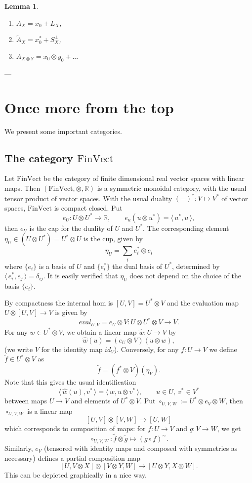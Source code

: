 \documentclass[12pt]{article}
\newtheorem{lemma}{Lemma}
\theoremstyle{definition}
\theoremstyle{remark}
\def\<{\langle\,}
\def\>{\,\rangle}
\def \FV{\mathrm{FinVect}}
\def\bX{ X}
\def\bY{ Y}
\begin{document}
\begin{lemma}\label{lemma:alls}
\begin{enumerate}
\item $A_\bX=x_0+L_\bX$,
\item $\tilde A_\bX=x_0^*+S_\bX^\perp$,
\item $A_{\bX\otimes \bY}=x_0\otimes y_0+...$

\end{enumerate}


\end{lemma}

---
\section{Once more from the top}

We present some important categories.

\subsection{The category $\FV$}

Let  $\FV$ be the category of finite dimensional real vector spaces with linear maps. Then
$(\FV,\otimes, \mathbb R)$ is a symmetric monoidal category, with the usual tensor product
of vector spaces. With the usual duality $(-)^*: V\mapsto V^*$  of vector spaces, $\FV$ is
compact closed.  Put
\[
e_U: U\otimes U^*\to \mathbb R,\qquad e_u(u\otimes u^*)=\<u^*,u\>,
\]
then $e_U$ is the cap for the duality of $U$ and $U^*$. The corresponding element
$\eta_U\in (U\otimes U^*)=U^*\otimes U$ is the cup, given by
\[
\eta_U=\sum_i e_i^*\otimes e_i
\]
where $\{e_i\}$ is a basis of $U$ and $\{e_i^*\}$ the dual basis of $U^*$, determined by
$\<e_i^*,e_j\>=\delta_{ij}$. It is easily verified that $\eta_U$ does not depend on the
choice of the basis $\{e_i\}$.

By compactness the internal hom is  $[U,V]=U^*\otimes V$ and the evaluation map $U\otimes
[U,V]\to V$ is given by
\[
eval_{U,V}=e_U\otimes V: U\otimes U^*\otimes V\to V.
\]
For any  $w\in U^*\otimes V$, we obtain a linear map $\hat w: U\to V$ by
\[
\hat w(u)=(e_U\otimes V)(u\otimes w),
\]
(we write $V$ for the identity map  $id_V$). Conversely, for any $f:U\to V$ we define 
$\tilde f\in U^*\otimes V$ as 
\[
\tilde f=(f^*\otimes V)(\eta_V).
\]
Note that this gives the usual identification 
\[
\<\hat w(u),v^*\>=\<w,u\otimes v^*\>,\qquad u\in U,\
v^*\in V^*
\]
between maps $U\to V$ and elements of $U^*\otimes V$.  Put $\circ_{U,V,W}:=U^*\otimes e_V\otimes
W$, then $\circ_{U,V,W}$ is  a linear map
\[
[U,V]\otimes [V,W]\to [U,W]
\]
which corresponds to composition of maps: for $f:U\to V$ and $g:V\to W$, we get
\[
\circ_{U,V,W}: \tilde f\otimes \tilde g\mapsto (g\circ f)^\sim.
\]
Similarly, $e_V$ (tensored with identity maps and composed with  symmetries as necessary) defines a partial
composition map
\[
[U,V\otimes X]\otimes [V\otimes Y,W]\to [U\otimes Y, X\otimes W].
\]
This can be depicted graphically in a nice way.
\end{document}
